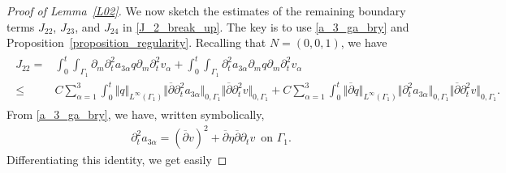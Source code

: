 \documentclass[10pt,reqno]{amsart}
\theoremstyle{plain}
\theoremstyle{definition}
\numberwithin{equation}{section}
\newcommand{\al}{\alpha}
\newcommand{\Ga}{\Gamma}
\newcommand{\norm}[1]{\Vert#1\Vert}
\begin{document}
\begin{proof}[Proof of Lemma~\ref{L02}]
We now sketch the estimates of the remaining boundary terms 
$J_{22}$, $J_{23}$, and $J_{24}$
in \eqref{J_2_break_up}.
The key is to use \eqref{a_3_ga_bry} and Proposition~\ref{proposition_regularity}.
Recalling that $N=(0,0,1)$, we have
\begin{align}
\begin{split}
J_{22} = &
\int_0^t \int_{\Ga_1} \partial_m \partial^2_t a_{3\al} q \partial_m \partial^2_t v_\al 
+\int_0^t \int_{\Ga_1} \partial^2_t a_{3\al} \partial_m  q  \partial_m \partial^2_t v_\al 
\\
\leq &
C \sum_{\al=1}^3 \int_0^t \norm{q}_{L^\infty(\Ga_1)} \norm{\overline{\partial}\partial^2_t  a_{3\al} }_{0,\Ga_1}
\norm{\overline{\partial} \partial^2_t v}_{0,\Ga_1}
+ 
C \sum_{\al=1}^3 \int_0^t \norm{\overline{\partial} q}_{L^\infty(\Ga_1)} \norm{
\partial^2_t a_{3\al} }_{0,\Ga_1}
\norm{ \overline{\partial} \partial^2_t v}_{0,\Ga_1}.
\end{split}
\nonumber
\end{align}
From \eqref{a_3_ga_bry},  we have, written symbolically,
\begin{gather}
\partial^2_t a_{3\al} = (\overline{\partial} v)^2
 + \overline{\partial} \eta \overline{\partial} \partial_t v
 \, \text{ on } \Ga_1
   .
\nonumber
\end{gather}
Differentiating this identity, we get
easily

\end{proof}
\end{document}

